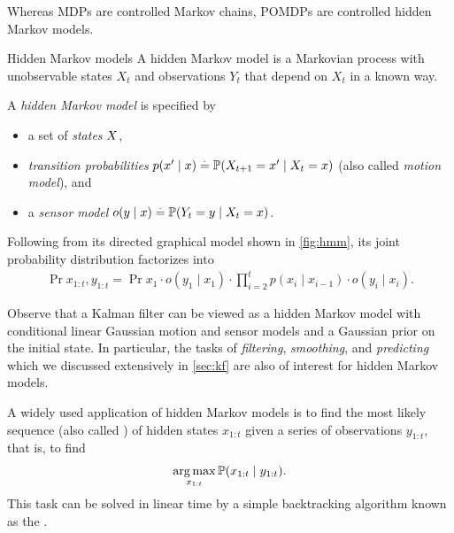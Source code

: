 Whereas MDPs are controlled Markov chains, POMDPs are controlled hidden Markov models.

\begin{marginfigure}[15\baselineskip]
  \caption{Directed graphical model of a hidden Markov model with hidden states $X_t$ and observables $Y_t$.}\label{fig:hmm}
\end{marginfigure}

\begin{rmk}{Hidden Markov models}{}
  A hidden Markov model is a Markovian process with unobservable states $X_t$ and observations $Y_t$ that depend on $X_t$ in a known way.

  \begin{defn}
    A \emph{hidden Markov model} is specified by \begin{itemize}
      \item a set of \emph{states} $X$,
      \item \emph{transition probabilities} $p(x' \mid x) \defeq \Pr{X_{t+1} = x' \mid X_t = x}$ (also called \emph{motion model}), and
      \item a \emph{sensor model} $o(y \mid x) \defeq \Pr{Y_t = y \mid X_t = x}$.
    \end{itemize}
  \end{defn}

  Following from its directed graphical model shown in \cref{fig:hmm}, its joint probability distribution factorizes into \begin{align}
    \Pr{x_{1:t}, y_{1:t}} = \Pr{x_1} \cdot o(y_1 \mid x_1) \cdot \prod_{i=2}^t p(x_i \mid x_{i-1}) \cdot o(y_i \mid x_i).
  \end{align}

  Observe that a Kalman filter can be viewed as a hidden Markov model with conditional linear Gaussian motion and sensor models and a Gaussian prior on the initial state.
  In particular, the tasks of \emph{filtering}, \emph{smoothing}, and \emph{predicting} which we discussed extensively in \cref{sec:kf} are also of interest for hidden Markov models.

  A widely used application of hidden Markov models is to find the most likely sequence (also called ) of hidden states $x_{1:t}$ given a series of observations $y_{1:t}$, that is, to find \begin{align}
    \argmax_{x_{1:t}} \Pr{x_{1:t} \mid y_{1:t}}.
  \end{align}
  This task can be solved in linear time by a simple backtracking algorithm known as the .
\end{rmk}

